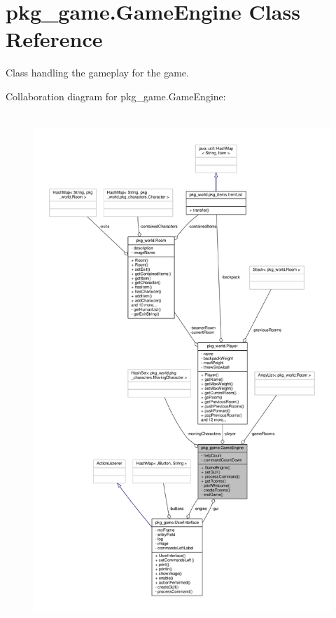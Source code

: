 \hypertarget{classpkg__game_1_1GameEngine}{\section{pkg\-\_\-game.\-Game\-Engine Class Reference}
\label{classpkg__game_1_1GameEngine}
}


Class handling the gameplay for the game.  




Collaboration diagram for pkg\-\_\-game.\-Game\-Engine\-:\nopagebreak
\begin{figure}[H]
\begin{center}
\leavevmode
\includegraphics[height=550pt]{classpkg__game_1_1GameEngine__coll__graph}
\end{center}
\end{figure}
